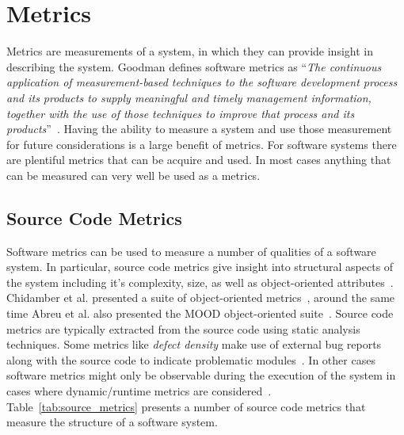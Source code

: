 \section{Metrics}
\label{sec:background_metrics}
Metrics are measurements of a system, in which they can provide insight in describing the system. Goodman defines software metrics as ``\emph{The continuous application of measurement-based techniques to the software development process and its products to supply meaningful and timely management information, together with the use of those techniques to improve that process and its products}''~\cite{Goo93}. Having the ability to measure a system and use those measurement for future considerations is a large benefit of metrics. For software systems there are plentiful metrics that can be acquire and used. In most cases anything that can be measured can very well be used as a metrics.


\subsection{Source Code Metrics}
\label{subsec:background_source_code_metrics}
Software metrics can be used to measure a number of qualities of a software system. In particular, source code metrics give insight into structural aspects of the system including it's complexity, size, as well as object-oriented attributes~\cite{McCa76, Kan02, HWY09, Hend95, SRD12}. Chidamber et al. presented a suite of object-oriented metrics~\cite{CK94}, around the same time Abreu et al. also presented the MOOD object-oriented suite~\cite{AC94}. Source code metrics are typically extracted from the source code using static analysis techniques. Some metrics like \emph{defect density} make use of external bug reports along with the source code to indicate problematic modules~\cite{FP98}. In other cases software metrics might only be observable during the execution of the system in cases where dynamic/runtime metrics are considered~\cite{SS08}. Table~\ref{tab:source_metrics} presents a number of source code metrics that measure the structure of a software system.

